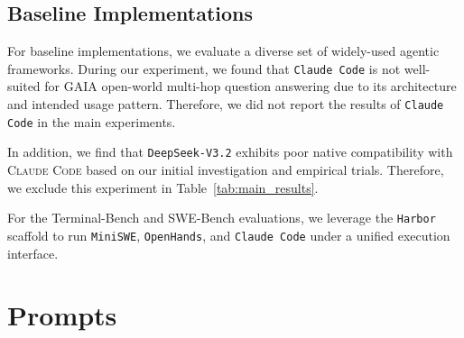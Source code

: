 \begin{table}[htbp]
\centering
{}
\caption{SFT Hyperparameters used.}
\label{tab:hyper_sft_qwen}
\end{table}


\subsection{Baseline Implementations}
\label{app:baseline_imp}
For baseline implementations, we evaluate a diverse set of widely-used agentic frameworks. 
During our experiment, we found that \texttt{Claude Code} is not well-suited for GAIA open-world multi-hop question answering due to its architecture and intended usage pattern. Therefore, we did not report the results of \texttt{Claude Code} in the main experiments.

In addition, we find that \texttt{DeepSeek-V3.2} exhibits poor native compatibility with \textsc{Claude Code} based on our initial investigation and empirical trials. Therefore, we exclude this experiment in Table~\ref{tab:main_results}.

For the Terminal-Bench and SWE-Bench evaluations, we leverage the \texttt{Harbor} scaffold to run \texttt{MiniSWE}, \texttt{OpenHands}, and \texttt{Claude Code} under a unified execution interface.


\section{Prompts}
\label{app:prompt_used}

